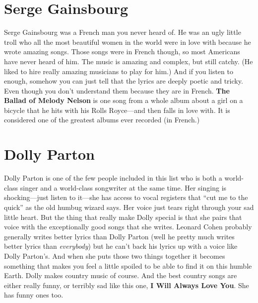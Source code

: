 \documentclass[letterpaper,single]{article}
\begin{document}
\section{Serge Gainsbourg}
Serge Gainsbourg was a French man you never heard of. 
He was an ugly little troll who all the most beautiful women in the world were in love with because he wrote amazing songs. 
Those songs were in French though, so most Americans have never heard of him. 
The music is amazing and complex, but still catchy. (He liked to hire really amazing musicians to play for him.)
And if you listen to enough, somehow you can just tell that the lyrics are deeply poetic and tricky.
Even though you don't understand them because they are in French.
\textbf{The Ballad of Melody Nelson} is one song from a whole album about a girl on a bicycle that he hits with his Rolls Royce---and then falls in love with. 
It is considered one of the greatest albums ever recorded (in French.)

\section{Dolly Parton}
Dolly Parton is one of the few people included in this list who is both a world-class singer and a world-class songwriter at the same time.
Her singing is shocking---just listen to it---she has access to vocal registers that ``cut me to the quick'' as the old humbug wizard says. 
Her voice just tears right through your sad little heart.
But the thing that really make Dolly special is that she pairs that voice with the exceptionally good songs that she writes.
Leonard Cohen probably generally writes better lyrics than Dolly Parton (well he pretty much writes better lyrics than \emph{everybody}) but he can't back his lyrics up with a voice like Dolly Parton's.
And when she puts those two things together it becomes something that makes you feel a little spoiled to be able to find it on this humble Earth.
Dolly makes country music of course. And the best country songs are either really funny, or terribly sad like this one, \textbf{I Will Always Love You}.
She has funny ones too.
\end{document}
